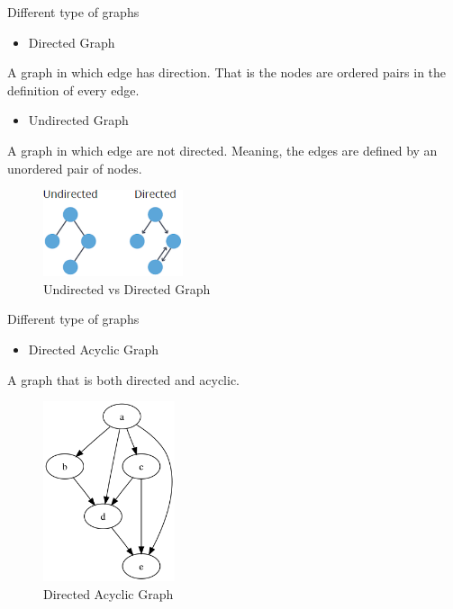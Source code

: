 \documentclass[ignorenonframetext,]{beamer}
\providecommand{\tightlist}{%
  \setlength{\itemsep}{0pt}\setlength{\parskip}{0pt}}
\begin{document}
\begin{frame}{Different type of graphs}
\protect\hypertarget{different-type-of-graphs-1}{}

\begin{itemize}
\tightlist
\item
  Directed Graph
\end{itemize}

A graph in which edge has direction. That is the nodes are ordered pairs
in the definition of every edge.

\begin{itemize}
\tightlist
\item
  Undirected Graph
\end{itemize}

A graph in which edge are not directed. Meaning, the edges are defined
by an unordered pair of nodes.

\begin{figure}
\centering
\includegraphics[width=\textwidth,height=1in]{undirected-directed.png}
\caption{Undirected vs Directed Graph}
\end{figure}

\end{frame}

\begin{frame}{Different type of graphs}
\protect\hypertarget{different-type-of-graphs-2}{}

\begin{itemize}
\tightlist
\item
  Directed Acyclic Graph
\end{itemize}

A graph that is both directed and acyclic.

\begin{figure}
\centering
\includegraphics[width=\textwidth,height=2.08333in]{dag.png}
\caption{Directed Acyclic Graph}
\end{figure}

\end{frame}
\end{document}
